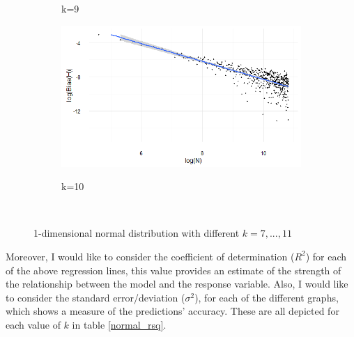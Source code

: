\documentclass{report}
\begin{document}
\begin{figure}
{\begin{subfigure}[b]{.8\textwidth}
\caption{k=9}
\end{subfigure}%
\begin{subfigure}[b]{.8\textwidth}
\centering
\includegraphics[width=\textwidth]{./Graphs/Best/Normal_k=10.png}\label{normal_k=10}
\caption{k=10}
\end{subfigure}%
}\    
\caption{1-dimensional normal distribution with different $k = 7, ...,11$} \label{normal_graphs711}
\end{figure}

Moreover, I would like to consider the coefficient of determination ($R^2$) for each of the above regression lines, this value provides an estimate of the strength of the relationship between the model and the response variable. Also, I would like to consider the standard error/deviation ($\sigma^2$), for each of the different graphs, which shows a measure of the predictions' accuracy. These are all depicted for each value of $k$ in table \ref{normal_rsq}.
\end{document}
